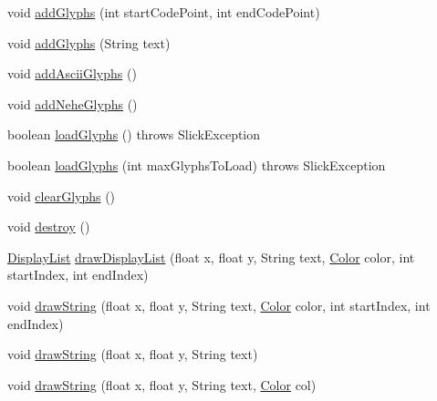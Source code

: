 \begin{DoxyCompactItemize}
\item 
void \mbox{\hyperlink{classorg_1_1newdawn_1_1slick_1_1_unicode_font_a54603f9fb72e1339e669be73d08a3963}{add\+Glyphs}} (int start\+Code\+Point, int end\+Code\+Point)
\item 
void \mbox{\hyperlink{classorg_1_1newdawn_1_1slick_1_1_unicode_font_a438d5ec21bef1e59730969d830041416}{add\+Glyphs}} (String text)
\item 
void \mbox{\hyperlink{classorg_1_1newdawn_1_1slick_1_1_unicode_font_aff50fdcbd957c6141d24dd877105110c}{add\+Ascii\+Glyphs}} ()
\item 
void \mbox{\hyperlink{classorg_1_1newdawn_1_1slick_1_1_unicode_font_a1c521d217c4c28d60a085fa65f57f459}{add\+Nehe\+Glyphs}} ()
\item 
boolean \mbox{\hyperlink{classorg_1_1newdawn_1_1slick_1_1_unicode_font_abf14d8ad33f80b66e14990417bd04088}{load\+Glyphs}} ()  throws Slick\+Exception 
\item 
boolean \mbox{\hyperlink{classorg_1_1newdawn_1_1slick_1_1_unicode_font_af8c400ea61a8e7d292d13575840edfe1}{load\+Glyphs}} (int max\+Glyphs\+To\+Load)  throws Slick\+Exception 
\item 
void \mbox{\hyperlink{classorg_1_1newdawn_1_1slick_1_1_unicode_font_acb2f2c11e0827f39efb939bc10e5f755}{clear\+Glyphs}} ()
\item 
void \mbox{\hyperlink{classorg_1_1newdawn_1_1slick_1_1_unicode_font_a41c92f27f67ef3ec3ce7b6849c0d6612}{destroy}} ()
\item 
\mbox{\hyperlink{classorg_1_1newdawn_1_1slick_1_1_unicode_font_1_1_display_list}{Display\+List}} \mbox{\hyperlink{classorg_1_1newdawn_1_1slick_1_1_unicode_font_a775b5c077b9f95f72955344cb7ff3164}{draw\+Display\+List}} (float x, float y, String text, \mbox{\hyperlink{classorg_1_1newdawn_1_1slick_1_1_color}{Color}} color, int start\+Index, int end\+Index)
\item 
void \mbox{\hyperlink{classorg_1_1newdawn_1_1slick_1_1_unicode_font_adc10a2fd18ea1ddbac3bcb2e7d14d0e2}{draw\+String}} (float x, float y, String text, \mbox{\hyperlink{classorg_1_1newdawn_1_1slick_1_1_color}{Color}} color, int start\+Index, int end\+Index)
\item 
void \mbox{\hyperlink{classorg_1_1newdawn_1_1slick_1_1_unicode_font_ac2c988a80ba2adb70f5bea216c26efc8}{draw\+String}} (float x, float y, String text)
\item 
void \mbox{\hyperlink{classorg_1_1newdawn_1_1slick_1_1_unicode_font_a20edc716f0bd41db0e8dc19b535cef25}{draw\+String}} (float x, float y, String text, \mbox{\hyperlink{classorg_1_1newdawn_1_1slick_1_1_color}{Color}} col)

\end{DoxyCompactItemize}
